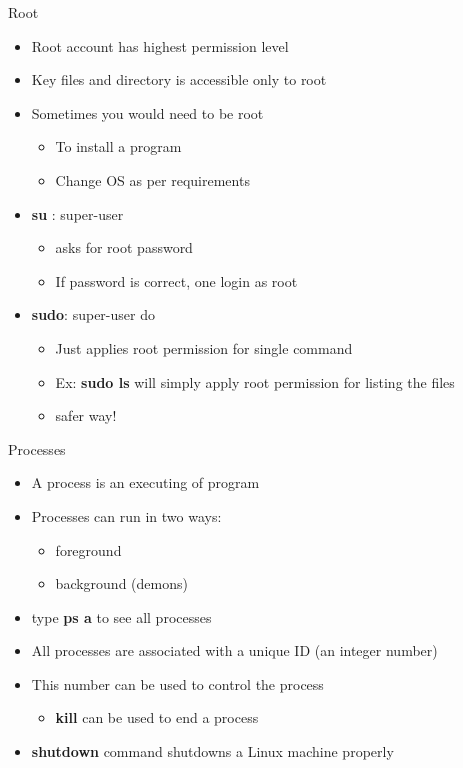 \begin{frame}{Root}
	\begin{itemize}
		\item Root account has highest permission level
		\item Key files and directory is accessible only to root
		\item Sometimes you would need to be root
		\begin{itemize}
			\item To install a program
			\item Change OS as per requirements
		\end{itemize}
		\item \textbf{su} : super-user
		\begin{itemize}
			\item asks for root password
			\item If password is correct, one login as root
		\end{itemize}
		\item \textbf{sudo}: super-user do
		\begin{itemize}
			\item Just applies root permission for single command
			\item Ex: \textbf{sudo ls} will simply apply root permission for listing the files
			\item safer way!
		\end{itemize}
	\end{itemize}
\end{frame}

\begin{frame}{Processes}
	\begin{itemize}
		\item A process is an executing of program
		\item Processes can run in two ways:
		\begin{itemize}
			\item foreground
			\item background (demons)
		\end{itemize}
		\item type \textbf{ps a} to see all processes
		\item All processes are associated with a unique ID (an integer number)
		\item This number can be used to control the process
		\begin{itemize}
			\item \textbf{kill} can be used to end a process
		\end{itemize}
		\item \textbf{shutdown} command shutdowns a Linux machine properly
	\end{itemize}
\end{frame}